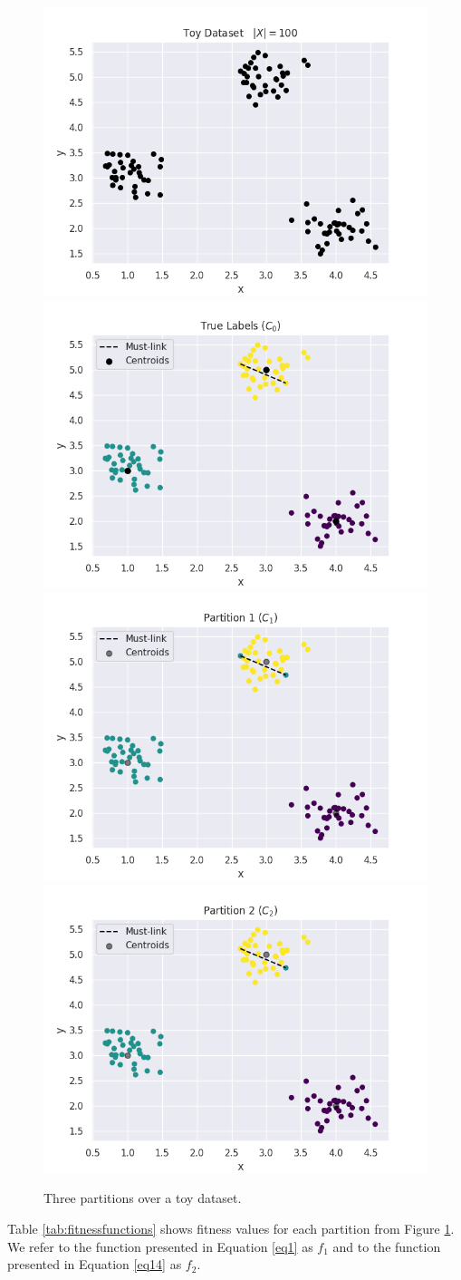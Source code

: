\documentclass[review]{elsarticle}
\newcommand{\myfloatalign}{\centering}
\begin{document}
\begin{figure}[bth]
	\myfloatalign
	{\includegraphics[width=.45\linewidth]{Figures/Dataset}} \quad
	{\includegraphics[width=.45\linewidth]{Figures/C0}} \quad
	{\includegraphics[width=.45\linewidth]{Figures/C1}} \quad
	{\includegraphics[width=.45\linewidth]{Figures/C2}} \quad
	\caption{Three partitions over a toy dataset.}
	\label{img:toydatasets}
\end{figure}

Table \ref{tab:fitnessfunctions} shows fitness values for each partition from Figure \ref{img:toydatasets}. We refer to the function presented in Equation \eqref{eq1} as $f_1$ and to the function presented in Equation \eqref{eq14} as $f_2$.
\end{document}
